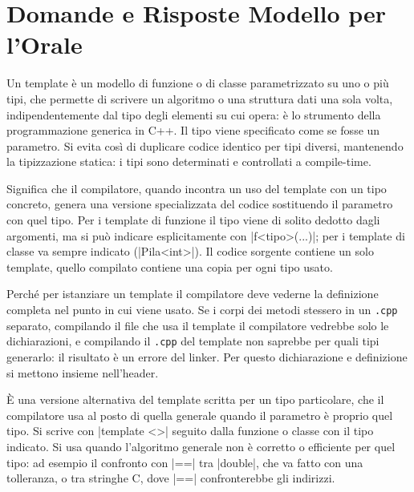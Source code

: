 \section{Domande e Risposte Modello per l'Orale}

\begin{orale}
Un template è un modello di funzione o di classe parametrizzato su uno o più tipi,
che permette di scrivere un algoritmo o una struttura dati una sola volta,
indipendentemente dal tipo degli elementi su cui opera: è lo strumento della
programmazione generica in C++. Il tipo viene specificato come se fosse un
parametro. Si evita così di duplicare codice identico per tipi diversi, mantenendo
la tipizzazione statica: i tipi sono determinati e controllati a compile-time.
\end{orale}

\begin{orale}
Significa che il compilatore, quando incontra un uso del template con un tipo
concreto, genera una versione specializzata del codice sostituendo il parametro con
quel tipo. Per i template di funzione il tipo viene di solito dedotto dagli
argomenti, ma si può indicare esplicitamente con \cc|f<tipo>(...)|; per i template
di classe va sempre indicato (\cc|Pila<int>|). Il codice sorgente contiene un solo
template, quello compilato contiene una copia per ogni tipo usato.
\end{orale}

\begin{orale}
Perché per istanziare un template il compilatore deve vederne la definizione
completa nel punto in cui viene usato. Se i corpi dei metodi stessero in un
\texttt{.cpp} separato, compilando il file che usa il template il compilatore
vedrebbe solo le dichiarazioni, e compilando il \texttt{.cpp} del template non
saprebbe per quali tipi generarlo: il risultato è un errore del linker. Per questo
dichiarazione e definizione si mettono insieme nell'header.
\end{orale}

\begin{orale}
È una versione alternativa del template scritta per un tipo particolare, che il
compilatore usa al posto di quella generale quando il parametro è proprio quel
tipo. Si scrive con \cc|template <>| seguito dalla funzione o classe con il tipo
indicato. Si usa quando l'algoritmo generale non è corretto o efficiente per quel
tipo: ad esempio il confronto con \cc|==| tra \cc|double|, che va fatto con una
tolleranza, o tra stringhe C, dove \cc|==| confronterebbe gli indirizzi.
\end{orale}

